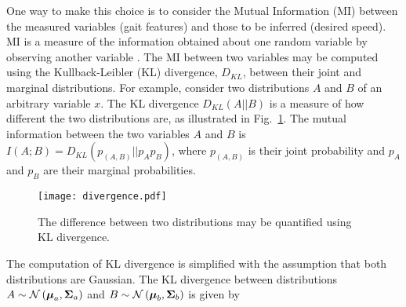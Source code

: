 One way to make this choice is to consider the Mutual Information (MI) between the measured variables (gait features) and those to be inferred (desired speed). MI is a measure of the information obtained about one random variable by observing another variable \cite{cover1999elements}. The MI between two variables may be computed using the Kullback-Leibler (KL) divergence, $ D_{KL} $, between their joint and marginal distributions. For example, consider two distributions $ A $ and $ B $ of an arbitrary variable $ x $. The KL divergence $ D_{KL}(A||B) $ is a measure of how different the two distributions are, as illustrated in Fig.~\ref{fig:divergence}. The mutual information between the two variables $ A $ and $ B $ is $ I(A;B) = D_{KL}(p_{(A,B)}||p_A p_B) $, where $ p_{(A,B)} $ is their joint probability and $ p_A $ and $ p_B $ are their marginal probabilities.
%
\begin{figure}
	\centering
	\texttt{[image: divergence.pdf]}
	\caption{The difference between two distributions may be quantified using KL divergence.}\label{fig:divergence}
\end{figure}

The computation of KL divergence is simplified with the assumption that both distributions are Gaussian. The KL divergence between distributions $ A \sim \mathcal{N}\left(\boldsymbol{\mu}_a, \boldsymbol{\Sigma}_a\right) $ and $ B \sim \mathcal{N}\left(\boldsymbol{\mu}_b, \boldsymbol{\Sigma}_b\right) $ is given by

